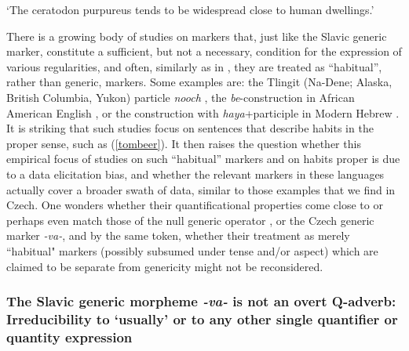 \documentclass[output=paper,colorlinks,citecolor=brown]{langscibook}
\begin{document}
\glt `The ceratodon purpureus tends to be widespread close to human dwellings.’
\z

\noindent There is a growing body of studies on
markers that, just like the Slavic generic marker, constitute
a sufficient, but not a necessary, condition
for the expression of various regularities, and often, similarly
as in \citet{dahl1995}, they are
treated as ``habitual'', rather than generic, markers.
Some examples are:
the Tlingit (Na-Dene; Alaska, British Columbia, Yukon) particle \textit{nooch} \citep{cable2022}, the \textit{be}-construction in African American English \citep{green2000aspectual}, or the construction with \textit{haya}+parti\-cip\-le in Modern Hebrew \citep{boneh2008habituality}.
It is striking  that such studies focus on sentences that describe habits in the proper sense, such as (\ref{tombeer}).
It then raises the question whether this empirical focus of studies
on such ``habitual'' markers and on habits
proper is due to a data elicitation bias, and whether
the relevant markers in these languages actually cover
a broader swath of data, similar to those examples that we find in
Czech.  One wonders whether their quantificational properties come close to or perhaps even match those of the null generic operator , or  the Czech generic marker \textit{-va-}, and by the same token,
whether their treatment as merely ``habitual" markers (possibly
subsumed under tense and/or aspect) which are claimed to be separate from genericity might not be reconsidered.

\subsubsection{The Slavic generic morpheme \textit{-va-} is not an overt Q-adverb: Irreducibility to `usually' or to any other single quantifier or quantity expression}\label{noqadv}
\end{document}

